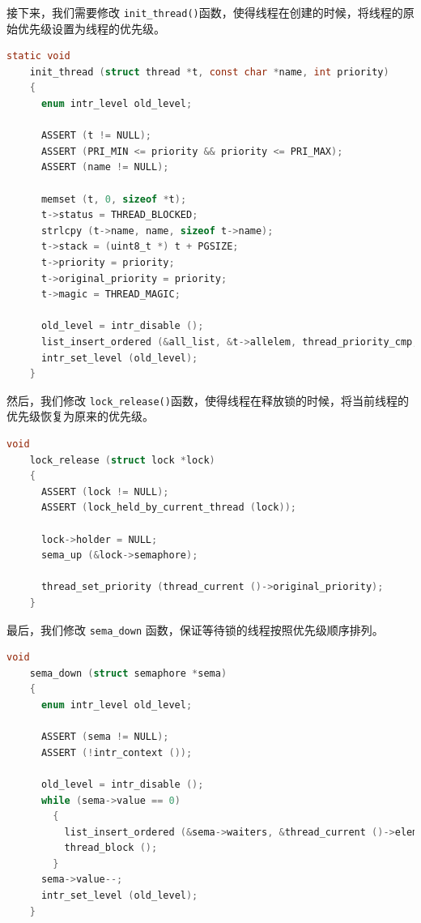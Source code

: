 \documentclass{article}
\begin{document}
接下来，我们需要修改 \texttt{init\_thread()}函数，使得线程在创建的时候，将线程的原始优先级设置为线程的优先级。

\begin{lstlisting}[language=C, title=修改后的\texttt{init\_thread()}函数]
    static void
    init_thread (struct thread *t, const char *name, int priority)
    {
      enum intr_level old_level;

      ASSERT (t != NULL);
      ASSERT (PRI_MIN <= priority && priority <= PRI_MAX);
      ASSERT (name != NULL);

      memset (t, 0, sizeof *t);
      t->status = THREAD_BLOCKED;
      strlcpy (t->name, name, sizeof t->name);
      t->stack = (uint8_t *) t + PGSIZE;
      t->priority = priority;
      t->original_priority = priority;
      t->magic = THREAD_MAGIC;

      old_level = intr_disable ();
      list_insert_ordered (&all_list, &t->allelem, thread_priority_cmp, NULL);
      intr_set_level (old_level);
    }

\end{lstlisting}

然后，我们修改 \texttt{lock\_release()}函数，使得线程在释放锁的时候，将当前线程的优先级恢复为原来的优先级。

\begin{lstlisting}[language=C, title=修改后的\texttt{lock\_release()}函数]
    void
    lock_release (struct lock *lock) 
    {
      ASSERT (lock != NULL);
      ASSERT (lock_held_by_current_thread (lock));
    
      lock->holder = NULL;
      sema_up (&lock->semaphore);
      
      thread_set_priority (thread_current ()->original_priority);
    }

\end{lstlisting}

最后，我们修改 \texttt{sema\_down} 函数，保证等待锁的线程按照优先级顺序排列。

\begin{lstlisting}[language=C, title=修改后的\texttt{sema\_down()}函数]
    void
    sema_down (struct semaphore *sema) 
    {
      enum intr_level old_level;
    
      ASSERT (sema != NULL);
      ASSERT (!intr_context ());
    
      old_level = intr_disable ();
      while (sema->value == 0) 
        {
          list_insert_ordered (&sema->waiters, &thread_current ()->elem, thread_priority_cmp, NULL);
          thread_block ();
        }
      sema->value--;
      intr_set_level (old_level);
    }
\end{lstlisting}
\end{document}
